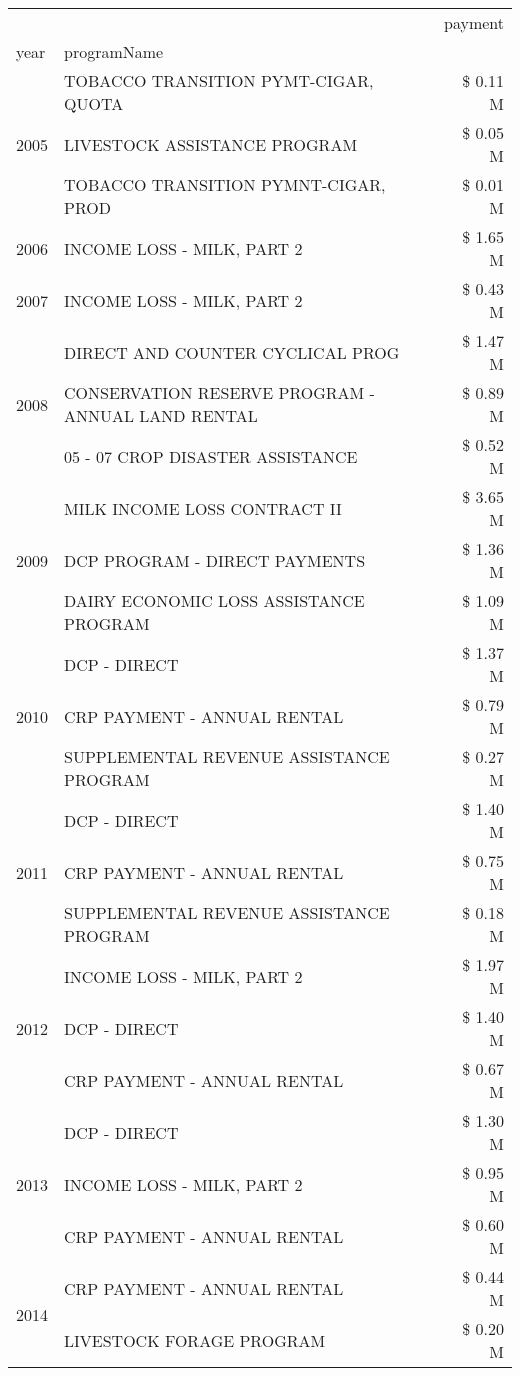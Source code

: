\begin{tabular}{llr}
\toprule
 &  & payment \\
year & programName &  \\
\midrule
\multirow[t]{3}{*}{2005} & TOBACCO TRANSITION PYMT-CIGAR, QUOTA & \$ 0.11 M \\
 & LIVESTOCK ASSISTANCE PROGRAM & \$ 0.05 M \\
 & TOBACCO TRANSITION PYMNT-CIGAR, PROD & \$ 0.01 M \\
\cline{1-3}
2006 & INCOME LOSS - MILK, PART 2 & \$ 1.65 M \\
\cline{1-3}
2007 & INCOME LOSS - MILK, PART 2 & \$ 0.43 M \\
\cline{1-3}
\multirow[t]{3}{*}{2008} & DIRECT AND COUNTER CYCLICAL PROG & \$ 1.47 M \\
 & CONSERVATION RESERVE PROGRAM - ANNUAL LAND RENTAL & \$ 0.89 M \\
 & 05 - 07 CROP DISASTER ASSISTANCE & \$ 0.52 M \\
\cline{1-3}
\multirow[t]{3}{*}{2009} & MILK INCOME LOSS CONTRACT II & \$ 3.65 M \\
 & DCP PROGRAM - DIRECT PAYMENTS & \$ 1.36 M \\
 & DAIRY ECONOMIC LOSS ASSISTANCE PROGRAM & \$ 1.09 M \\
\cline{1-3}
\multirow[t]{3}{*}{2010} & DCP - DIRECT & \$ 1.37 M \\
 & CRP PAYMENT - ANNUAL RENTAL & \$ 0.79 M \\
 & SUPPLEMENTAL REVENUE ASSISTANCE PROGRAM & \$ 0.27 M \\
\cline{1-3}
\multirow[t]{3}{*}{2011} & DCP - DIRECT & \$ 1.40 M \\
 & CRP PAYMENT - ANNUAL RENTAL & \$ 0.75 M \\
 & SUPPLEMENTAL REVENUE ASSISTANCE PROGRAM & \$ 0.18 M \\
\cline{1-3}
\multirow[t]{3}{*}{2012} & INCOME LOSS - MILK, PART 2 & \$ 1.97 M \\
 & DCP - DIRECT & \$ 1.40 M \\
 & CRP PAYMENT - ANNUAL RENTAL & \$ 0.67 M \\
\cline{1-3}
\multirow[t]{3}{*}{2013} & DCP - DIRECT & \$ 1.30 M \\
 & INCOME LOSS - MILK, PART 2 & \$ 0.95 M \\
 & CRP PAYMENT - ANNUAL RENTAL & \$ 0.60 M \\
\cline{1-3}
\multirow[t]{3}{*}{2014} & CRP PAYMENT - ANNUAL RENTAL & \$ 0.44 M \\
 & LIVESTOCK FORAGE PROGRAM & \$ 0.20 M \\

\end{tabular}
